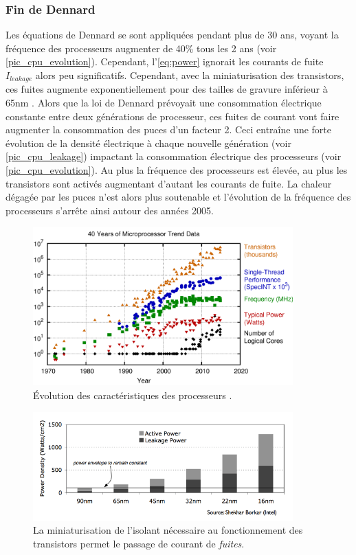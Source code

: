 \subsubsection{Fin de Dennard}
Les équations de Dennard se sont appliquées pendant plus de 30 ans, voyant la fréquence des processeurs augmenter de 40\% tous les 2 ans (voir \autoref{pic_cpu_evolution}). Cependant, l'\autoref{eq:power} ignorait les courants de fuite $I_{leakage}$ alors peu significatifs. Cependant, avec la miniaturisation des transistors, ces fuites augmente exponentiellement pour des tailles de gravure inférieur à 65nm \cite{martin2014post}. Alors que la loi de Dennard prévoyait une consommation électrique constante entre deux générations de processeur, ces fuites de courant vont faire augmenter la consommation des puces d'un facteur 2. Ceci entraîne une forte évolution de la densité électrique à chaque nouvelle génération (voir \autoref{pic_cpu_leakage}) impactant la consommation électrique des processeurs (voir \autoref{pic_cpu_evolution}). Au plus la fréquence des processeurs est élevée, au plus les transistors sont activés augmentant d'autant les courants de fuite. La chaleur dégagée par les puces n'est alors plus soutenable et l'évolution de la fréquence des processeurs s'arrête ainsi autour des années 2005.

\begin{figure}
    \center
    \includegraphics[width=10cm]{images/cpu_evolution.png}
    \caption{\label{pic_cpu_evolution} Évolution des caractéristiques des processeurs \cite{rupp40years}.}
\end{figure}

\begin{figure}
    \center
    \includegraphics[width=10cm]{images/cpu_leakage.png}
    \caption{\label{pic_cpu_leakage} La miniaturisation de l'isolant nécessaire au fonctionnement des transistors permet le passage de courant de \textit{fuites}.}
\end{figure}

